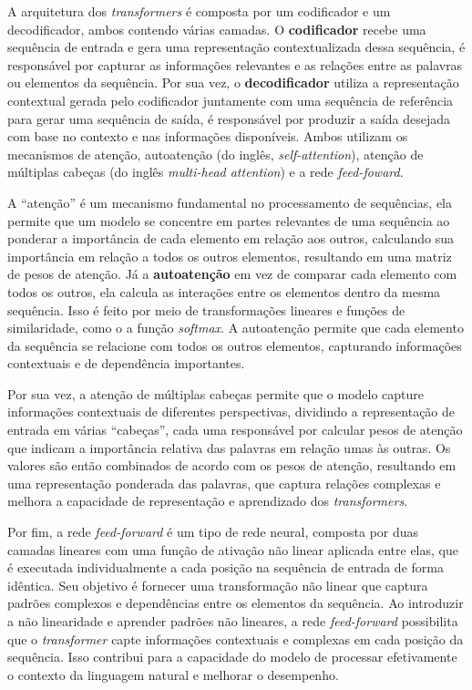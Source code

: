 A arquitetura dos \textit{transformers} é composta por um codificador e um decodificador, ambos contendo várias camadas. O \textbf{codificador} recebe uma sequência de entrada e gera uma representação contextualizada dessa sequência, é responsável por capturar as informações relevantes e as relações entre as palavras ou elementos da sequência. Por sua vez, o \textbf{decodificador} utiliza a representação contextual gerada pelo codificador juntamente com uma sequência de referência para gerar uma sequência de saída, é responsável por produzir a saída desejada com base no contexto e nas informações disponíveis. Ambos utilizam os mecanismos de atenção, autoatenção (do inglês, \textit{self-attention}), atenção de múltiplas cabeças (do inglês \textit{multi-head attention}) e a rede \textit{feed-foward}.

A ``atenção'' é um mecanismo fundamental no processamento de sequências, ela permite que um modelo se concentre em partes relevantes de uma sequência ao ponderar a importância de cada elemento em relação aos outros, calculando sua importância em relação a todos os outros elementos, resultando em uma matriz de pesos de atenção. Já a \textbf{autoatenção} em vez de comparar cada elemento com todos os outros, ela calcula as interações entre os elementos dentro da mesma sequência. Isso é feito por meio de transformações lineares e funções de similaridade, como o a função \textit{softmax}. A autoatenção permite que cada elemento da sequência se relacione com todos os outros elementos, capturando informações contextuais e de dependência importantes. 

Por sua vez, a atenção de múltiplas cabeças permite que o modelo capture informações contextuais de diferentes perspectivas, dividindo a representação de entrada em várias ``cabeças'', cada uma responsável por calcular pesos de atenção que indicam a importância relativa das palavras em relação umas às outras. Os valores são então combinados de acordo com os pesos de atenção, resultando em uma representação ponderada das palavras, que captura relações complexas e melhora a capacidade de representação e aprendizado dos \textit{transformers}.

Por fim, a rede \textit{feed-forward} é um tipo de rede neural, composta por duas camadas lineares com uma função de ativação não linear aplicada entre elas, que é executada individualmente a cada posição na sequência de entrada de forma idêntica. Seu objetivo é fornecer uma transformação não linear que captura padrões complexos e dependências entre os elementos da sequência. Ao introduzir a não linearidade e aprender padrões não lineares, a rede \textit{feed-forward} possibilita que o \textit{transformer} capte informações contextuais e complexas em cada posição da sequência. Isso contribui para a capacidade do modelo de processar efetivamente o contexto da linguagem natural e melhorar o desempenho.

